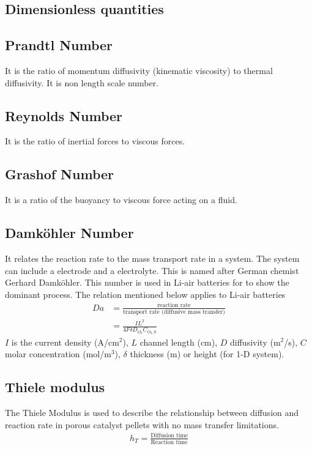 \documentclass[12pt]{book}
\begin{document}
\subsection{Dimensionless quantities}
\subsection{Prandtl Number} It is the ratio of momentum diffusivity (kinematic viscosity) to thermal diffusivity. It is non length scale number.
\subsection{Reynolds Number} It is the ratio of inertial forces to viscous forces.
\subsection{Grashof Number} It is a ratio of the buoyancy to viscous force acting on a fluid.
\subsection{Damk\"{o}hler Number} 
\label{Damkohler Number}
It relates the reaction rate to the mass transport rate in a system. The system can include a electrode and a electrolyte. This is named after German chemist Gerhard Damk\"{o}hler. This number is used in Li-air batteries for to show the dominant process.
The relation mentioned below applies to Li-air batteries	
\begin{align}
Da &= \frac{\textrm{reaction rate}}{\textrm{transport rate (diffusive mass transfer)}}\nonumber\\
&= \frac{IL^2}{4F\delta D_{O_2}C_{O_{2},0}}
\label{Damkohler Number relation}
\end{align}
$I$ is the current density (A/cm$^2$), $L$ channel length (cm), $D$ diffusivity (m$^2$/s), $C$ molar concentration (mol/m$^3$), $\delta$ thickness (m) or height (for 1-D system). \cite{Wang2014d}
\subsection{Thiele modulus}
The Thiele Modulus is used to describe the relationship between diffusion and reaction rate in porous catalyst pellets with no mass transfer limitations.
\begin{align}
h_T = \frac{\textrm{Diffusion time}}{\textrm{Reaction time}}
\end{align}
\end{document}
